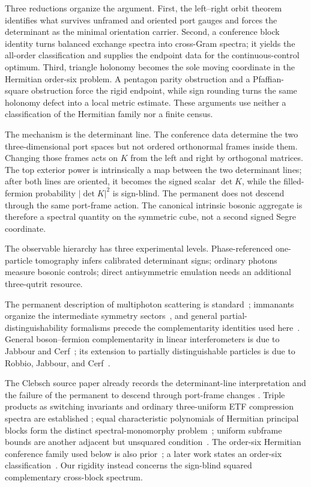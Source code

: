 \documentclass[11pt]{article}
\theoremstyle{remark}
\begin{document}
Three reductions organize the argument.  First, the left--right orbit theorem
identifies what survives unframed and oriented port gauges and forces the
determinant as the minimal orientation carrier.  Second, a conference block
identity turns balanced exchange spectra into cross-Gram spectra; it yields
the all-order classification and supplies the endpoint data for the
continuous-control optimum.  Third, triangle holonomy becomes the sole moving
coordinate in the Hermitian
order-six problem.  A pentagon parity obstruction and a Pfaffian-square
obstruction force the rigid endpoint, while sign rounding turns the same
holonomy defect into a local metric estimate.  These arguments use neither a
classification of the Hermitian family nor a finite census.

The mechanism is the determinant line.  The conference data determine the two
three-dimensional port spaces but not ordered orthonormal frames inside them.
Changing those frames acts on \(K\) from the left and right by orthogonal
matrices.  The top exterior power is intrinsically a map between the two
determinant lines; after both lines are oriented, it becomes the signed scalar
\(\det K\), while the filled-fermion probability \(|\det K|^2\) is
sign-blind.  The permanent does not descend through the same port-frame
action.  The canonical intrinsic bosonic aggregate is therefore a spectral
quantity on the symmetric cube, not a second signed Segre coordinate.

The observable hierarchy has three experimental levels.  Phase-referenced
one-particle tomography infers calibrated determinant signs; ordinary photons
measure bosonic controls; direct antisymmetric emulation needs an additional
three-qutrit resource.

The permanent description of multiphoton scattering is
standard~\cite{Scheel}; immanants
organize the intermediate symmetry sectors~\cite{Tichy}, and general
partial-distinguishability formalisms precede the complementarity identities
used here~\cite{Shchesnovich}.  General boson--fermion complementarity in
linear interferometers is due to
Jabbour and Cerf~\cite{JabbourCerf}; its extension to partially distinguishable
particles is due to Robbio, Jabbour, and Cerf~\cite{RobbioJabbourCerf}.

The
Clebsch source paper already records the determinant-line interpretation and
the failure of the permanent to descend through port-frame changes
\cite[Section~5]{ClebschIII}.  Triple products as switching invariants and
ordinary three-uniform ETF compression spectra are established
\cite{BodmannPaulsen,HoffmanSolazzo,KingHomogeneous}; equal characteristic
polynomials of Hermitian principal blocks form the distinct spectral-monomorphy
problem~\cite{AttasSpectral}; uniform subframe bounds are another adjacent but
unsquared condition~\cite{ChengUSB}.  The order-six Hermitian conference family used
below is also prior~\cite{EtTaouiConference}; a later work states an
order-six classification~\cite{EtTaouiMakhlouf}.  Our rigidity instead
concerns the sign-blind squared complementary cross-block spectrum.
\end{document}
